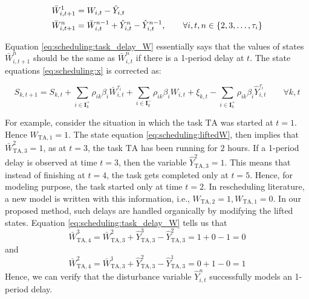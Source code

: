\begin{align}
\label{eq:scheduling:task_delay_W}
\bar{W}_{i,t+1}^{1} &= W_{i,t} - \hat{Y}_{i,t} \nonumber \\
\bar{W}_{i,t+1}^{n} &= \bar{W}_{i,t}^{n-1} + \hat{Y}_{i,t}^{n} -
\hat{Y}_{i,t}^{n-1},\qquad \forall i,t,n \in \left\lbrace 2,3,\ldots,\tau_i \right\rbrace
\end{align}

Equation \eqref{eq:scheduling:task_delay_W} essentially says that the
values of states $\bar{W}_{i,t+1}^{n}$ should be the same as
$\bar{W}_{i,t}^{n}$ if there is a 1-period delay at $t$.  The state
equations \eqref{eq:scheduling:x} is corrected as:

\begin{equation}
\label{eq:scheduling:task_delay_S}
S_{k,t+1} = S_{k,t} + \sum_{i\in
  \mathbf{I}_k^+}\rho_{ik}\beta_i\bar{W}_{i,t}^{\tau_i} + \sum_{i\in
  \mathbf{I}_k^-}\rho_{ik}\beta_iW_{i,t}+ \xi_{k,t} - \sum_{i\in
  \mathbf{I}_k^+}\rho_{ik}\beta_i\hat{Y}_{i,t}^{\tau_i}    \qquad \forall k,t
\end{equation}

For example, consider the situation in which the task $\text{TA}$ was
started at $t=1$. Hence $W_{\text{TA},1} = 1$. The state equation
\eqref{eq:scheduling:liftedW}, then implies that
$\bar{W}_{\text{TA},3}^{2} = 1$, as at $t=3$, the task $\text{TA}$ has
been running for $2$ hours. If a 1-period delay is observed at time
$t=3$, then the variable $\hat{Y}_{\text{TA},3}^{2} = 1$. This means that
instead of finishing at $t=4$, the task gets completed only at
$t=5$. Hence, for modeling purpose, the task started only at time
$t=2$. In rescheduling literature, a new model is written with this
information, i.e., $W_{\text{TA},2}=1, W_{\text{TA},1}=0$. In our
proposed method, such delays are handled organically by modifying the
lifted states. Equation \eqref{eq:scheduling:task_delay_W} tells us
that
\[ \bar{W}_{\text{TA},4}^{3} = \bar{W}_{\text{TA},3}^{2} +
\hat{Y}_{\text{TA},3}^{3} -\hat{Y}_{\text{TA},3}^{2} = 1+0 -1 = 0 \]
and 
\[ \bar{W}_{\text{TA},4}^{2} = \bar{W}_{\text{TA},3}^{1} +
\hat{Y}_{\text{TA},3}^{2} -\hat{Y}_{\text{TA},3}^{1} = 0+1-0 = 1\]
Hence, we can verify that the disturbance variable $\hat{Y}_{i,t}^{n}$
successfully models an 1-period delay. 

